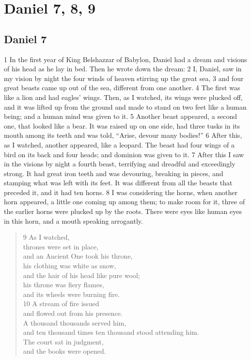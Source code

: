 \chapter{Daniel 7, 8, 9}
\label{ch:daniel7-9}

\section{Daniel 7}
1 In the first year of King Belshazzar of Babylon, Daniel had a dream and visions
of his head as he lay in bed. Then he wrote down the dream: 2 I, Daniel, saw in
my vision by night the four winds of heaven stirring up the great sea, 3 and 
four great beasts came up out of the sea, different from one another. 4 The 
first was like a lion and had eagles' wings. Then, as I watched, its wings were
plucked off, and it was lifted up from the ground and made to stand on two feet 
like a human being; and a human mind was given to it. 5 Another beast appeared, 
a second one, that looked like a bear. It was raised up on one side, had three 
tusks in its mouth among its teeth and was told, ``Arise, devour many bodies!'' 
6 After this, as I watched, another appeared, like a leopard. The beast had 
four wings of a bird on its back and four heads; and dominion was given to it.
7 After this I saw in the visions by night a fourth beast, terrifying and 
dreadful and exceedingly strong. It had great iron teeth and was devouring, 
breaking in pieces, and stamping what was left with its feet. It was different
from all the beasts that preceded it, and it had ten horns. 8 I was considering
the horns, when another horn appeared, a little one coming up among them; to 
make room for it, three of the earlier horns were plucked up by the roots. 
There were eyes like human eyes in this horn, and a mouth speaking arrogantly.

\begin{verse}
9 As I watched,\\
thrones were set in place,\\
\hspace{1.5em} and an Ancient One took his throne,\\
his clothing was white as snow,\\
\hspace{1.5em} and the hair of his head like pure wool;\\
his throne was fiery flames,\\
\hspace{1.5em} and its wheels were burning fire.\\
10 A stream of fire issued\\
\hspace{1.5em} and flowed out from his presence.\\
A thousand thousands served him,\\
\hspace{1.5em} and ten thousand times ten thousand stood attending him.\\
The court sat in judgment,\\
\hspace{1.5em} and the books were opened.
\end{verse}

